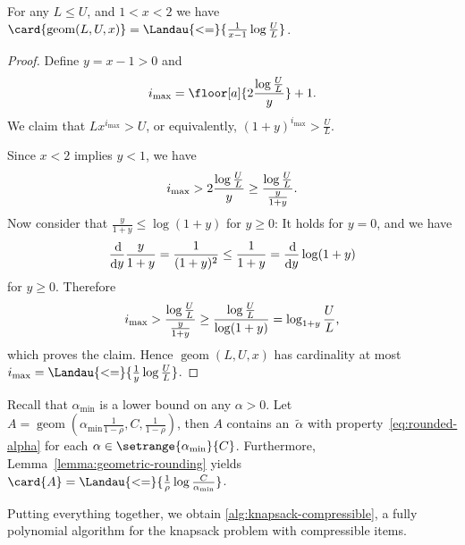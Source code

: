 \begin{lemma}
  \label{lemma:geometric-rounding}
  For any $L \leq U$, and $1 < x < 2$ we have $\card{\mathop{\mathrm{geom}}(L, U, x)} = \Landau{<=}{\frac{1}{x-1} \log \frac{U}{L}}$.
\end{lemma}

\begin{proof}
  Define $y = x - 1 > 0$ and
  \begin{equation}
    i_{\max} = \floor[a]{2 \frac{\log \frac{U}{L}}{y}} + 1 \dpunct{.}
  \end{equation}
  We claim that $L x^{i_{\max}} > U$, or equivalently, $(1+y)^{i_{\max}} > \frac{U}{L}$.
  
  Since $x < 2$ implies $y < 1$, we have
  \begin{equation}
    i_{\max} > 2 \frac{\log \frac{U}{L}}{y} \geq \frac{\log \frac{U}{L}}{\frac{y}{1+y}} \text{.}
  \end{equation}
  Now consider that $\frac{y}{1 + y} \leq \log (1+y)$ for $y \geq 0$:
  It holds for $y = 0$,
  and we have
  \begin{equation}
    \frac{\mathop{\mathrm{d}}\! }{\mathop{\mathrm{d}}\! y} \frac{y}{1 + y} = \frac{1}{(1+y)^2} \leq \frac{1}{1 + y} = \frac{\mathop{\mathrm{d}}\! }{\mathop{\mathrm{d}}\! y} \log (1+y)
  \end{equation}    
  for $y \geq 0$.
  Therefore
  \begin{equation}
    i_{\max} > \frac{\log \frac{U}{L}}{\frac{y}{1+y}}
    \geq \frac{\log \frac{U}{L}}{\log (1 + y)}
    = \log_{1+y} \frac{U}{L} \text{,}
  \end{equation}
  which proves the claim.
  Hence $\mathop{\mathrm{geom}}(L, U, x)$ has cardinality at most $i_{\max} = \Landau{<=}{\frac{1}{y} \log \frac{U}{L}}$.
\end{proof}

Recall that $\alpha_{\min}$ is a lower bound on any $\alpha > 0$.
Let $A = \mathop{\mathrm{geom}}(\alpha_{\min} \frac{1}{1-\rho}, C, \frac{1}{1-\rho})$,
then $A$ contains an~$\tilde{\alpha}$ with property~\eqref{eq:rounded-alpha}
for each $\alpha \in \setrange{\alpha_{\min}}{C}$.
Furthermore, Lemma~\ref{lemma:geometric-rounding} yields $\card{A} = \Landau{<=}{\frac{1}{\rho} \log \frac{C}{\alpha_{\min}}}$.

Putting everything together, we obtain \cref{alg:knapsack-compressible},
a fully polynomial algorithm for the knapsack problem with compressible items.

